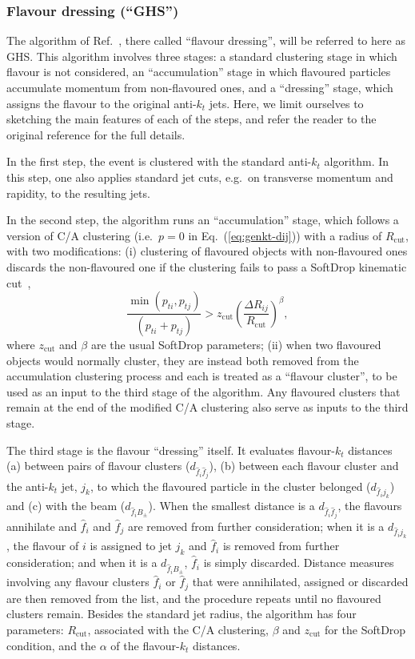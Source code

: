 \documentclass[nofootinbib,twocolumn,preprintnumbers,superscriptaddress,aps]{revtex4-2}
\newcommand{\cut}{\text{cut}}
\begin{document}
\subsubsection{Flavour dressing (``GHS'')}
\label{sec:ghs}

The algorithm of Ref.~\cite{Gauld:2022lem}, there called ``flavour
dressing'', will be referred to here as GHS.
%
This algorithm involves three stages: a standard
clustering stage in which flavour is not considered, an
``accumulation'' stage in which flavoured particles accumulate
momentum from non-flavoured ones, and a ``dressing'' stage, which
assigns the flavour to the original anti-$k_t$ jets.
%
Here, we limit ourselves to sketching the main features of
each of the steps, and refer the reader to the original reference for
the full details.

In the first step, the event is clustered with the standard anti-$k_t$
algorithm.
%
In this step, one also applies standard jet cuts, e.g.\ on transverse
momentum and rapidity, to the resulting jets.

In the second step, the algorithm runs an ``accumulation'' stage, which follows
a version of C/A clustering (i.e.\ $p=0$ in
Eq.~(\ref{eq:genkt-dij})) with a radius of $R_\text{cut}$, with two
modifications: (i) clustering of flavoured objects with non-flavoured
ones discards the non-flavoured one if the clustering fails to pass a
SoftDrop kinematic cut~\cite{Larkoski:2014wba},
\begin{equation}
  \label{eq:SD-cut}
   \frac{\min(p_{ti},p_{tj})}{(p_{ti}+p_{tj})}
  > z_\text{cut}
    \left(\frac{\Delta R_{ij}}{R_\text{cut}}\right)^\beta,
\end{equation}
where $z_\cut$ and $\beta$ are the usual SoftDrop parameters;
%
(ii) when two flavoured objects would normally cluster, they are
instead both removed from the accumulation clustering process and each is treated
as a ``flavour cluster'', to be used as an input to the third stage of
the algorithm.
%
Any flavoured clusters that remain at the end of the modified C/A
clustering also serve as inputs to the third stage.

The third stage is the flavour ``dressing'' itself.
%
It evaluates flavour-$k_t$ distances (a) between pairs of flavour
clusters ($d_{\hat f_i \hat f_j}$), (b) between each flavour cluster
and the anti-$k_t$ jet, $j_k$, to which the flavoured particle in the
cluster belonged ($d_{\hat f_i j_k}$) and (c) with the beam
($d_{\hat f_i B_\pm}$).
%
When the smallest distance is a $d_{\hat f_i \hat f_j}$, the flavours
annihilate and $\hat f_i$ and $\hat f_j$ are removed from further
consideration;
%
when it is a $d_{\hat f_i j_k}$, the flavour of $i$ is assigned to jet
$j_k$ and $\hat f_i$ is removed from further consideration; and when
it is a $d_{\hat f_i B_\pm}$, $\hat f_i$ is simply discarded.
%
Distance measures involving any flavour clusters $\hat f_i$ or
$\hat f_j$ that were annihilated, assigned or discarded are then
removed from the list, and the procedure repeats until no flavoured
clusters remain.
%
Besides the standard jet radius, the algorithm has four parameters:
$R_\cut$, associated with the C/A clustering, $\beta$ and
$z_\text{cut}$ for the SoftDrop condition, and the $\alpha$ of the
flavour-$k_t$ distances.
\end{document}
